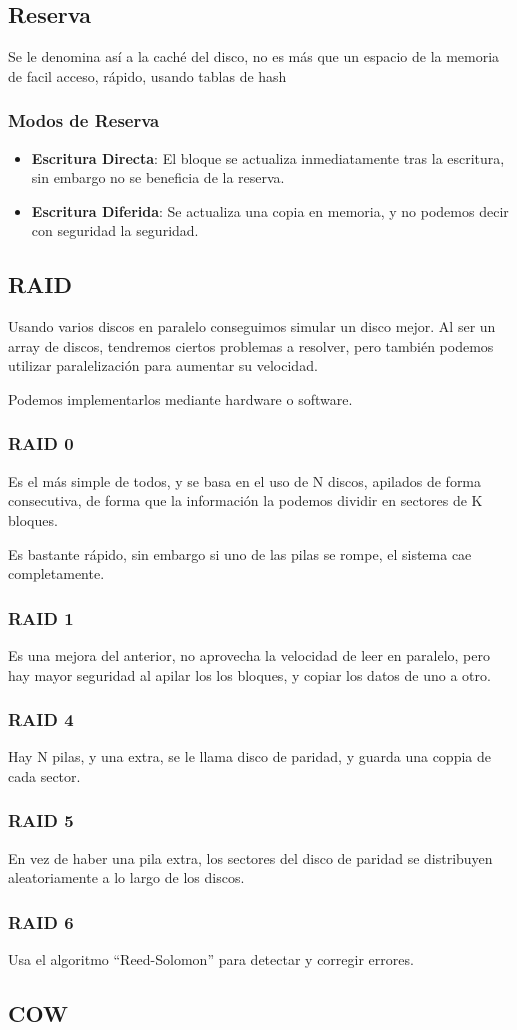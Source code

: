 \subsection{Reserva}
\noindent Se le denomina así a la caché del disco, no es más que un espacio de la memoria de facil acceso, rápido, usando tablas de hash
\subsubsection{Modos de Reserva}
\begin{itemize}
        \item \textbf{Escritura Directa}: El bloque se actualiza inmediatamente tras la escritura, sin embargo no se beneficia de la reserva.
        \item \textbf{Escritura Diferida}: Se actualiza una copia en memoria, y no podemos decir con seguridad la seguridad.
\end{itemize}
\subsection{RAID}
\noindent Usando varios discos en paralelo conseguimos simular un disco mejor. Al ser un array de discos, tendremos ciertos problemas a resolver, pero también podemos utilizar paralelización para aumentar su velocidad.
\par \noindent Podemos implementarlos mediante hardware o software.
\subsubsection{RAID 0}
\noindent Es el más simple de todos, y se basa en el uso de N discos, apilados de forma consecutiva, de forma que la información la podemos dividir en sectores de K bloques.
\par \noindent Es bastante rápido, sin embargo si uno de las pilas se rompe, el sistema cae completamente.
\subsubsection{RAID 1}
\noindent Es una mejora del anterior, no aprovecha la velocidad de leer en paralelo, pero hay mayor seguridad al apilar los los bloques, y copiar los datos de uno a otro.
\subsubsection{RAID 4}
\noindent Hay N pilas, y una extra, se le llama disco de paridad, y guarda una coppia de cada sector.
\subsubsection{RAID 5}
\noindent En vez de haber una pila extra, los sectores del disco de paridad se distribuyen aleatoriamente a lo largo de los discos.
\subsubsection{RAID 6}
\noindent Usa el algoritmo ``Reed-Solomon'' para detectar y corregir errores.
\subsection{COW}